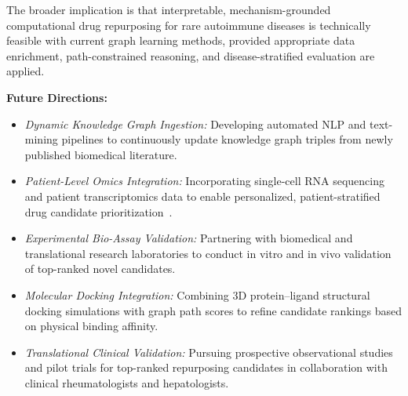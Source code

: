 \documentclass[conference]{IEEEtran}
\begin{document}
The broader implication is that interpretable, mechanism-grounded computational drug repurposing for rare autoimmune diseases is technically feasible with current graph learning methods, provided appropriate data enrichment, path-constrained reasoning, and disease-stratified evaluation are applied.

\textbf{Future Directions:}
\begin{itemize}
    \item \textit{Dynamic Knowledge Graph Ingestion:} Developing automated NLP and text-mining pipelines to continuously update knowledge graph triples from newly published biomedical literature.
    \item \textit{Patient-Level Omics Integration:} Incorporating single-cell RNA sequencing and patient transcriptomics data to enable personalized, patient-stratified drug candidate prioritization~\cite{omics_repurposing}.
    \item \textit{Experimental Bio-Assay Validation:} Partnering with biomedical and translational research laboratories to conduct in vitro and in vivo validation of top-ranked novel candidates.
    \item \textit{Molecular Docking Integration:} Combining 3D protein--ligand structural docking simulations with graph path scores to refine candidate rankings based on physical binding affinity.
    \item \textit{Translational Clinical Validation:} Pursuing prospective observational studies and pilot trials for top-ranked repurposing candidates in collaboration with clinical rheumatologists and hepatologists.
\end{itemize}
\end{document}
